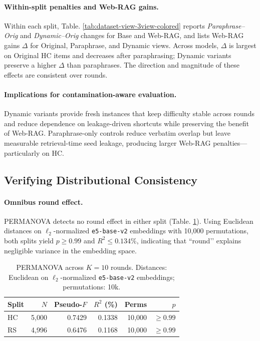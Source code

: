 \paragraph{Within-split penalties and Web-RAG gains.}
Within each split, Table. \ref{tab:dataset-view-3view-colored} reports \textit{Paraphrase–Orig} and \textit{Dynamic–Orig} changes for Base and Web-RAG, and lists Web-RAG gains $\Delta$ for Original, Paraphrase, and Dynamic views. Across models, $\Delta$ is largest on Original HC items and decreases after paraphrasing; Dynamic variants preserve a higher $\Delta$ than paraphrases. The direction and magnitude of these effects are consistent over rounds.

\paragraph{Implications for contamination-aware evaluation.}
Dynamic variants provide fresh instances that keep difficulty stable across rounds and reduce dependence on leakage-driven shortcuts while preserving the benefit of Web-RAG. Paraphrase-only controls reduce verbatim overlap but leave measurable retrieval-time seed leakage, producing larger Web-RAG penalties—particularly on HC. 


\subsection{Verifying Distributional Consistency}
\label{subsec:consistency-results}

\paragraph{Omnibus round effect.}
PERMANOVA detects no round effect in either split (Table. \ref{tab:omnibus}). Using Euclidean distances on $\ell_2$-normalized \texttt{e5-base-v2} embeddings with 10{,}000 permutations, both splits yield $p \geq 0.99$ and $R^2 \leq 0.134\%$, indicating that “round’’ explains negligible variance in the embedding space.

\begin{table}[t]
\centering
\setlength{\tabcolsep}{5pt}
\caption{PERMANOVA across $K{=}10$ rounds. Distances: Euclidean on $\ell_2$-normalized \texttt{e5-base-v2} embeddings; permutations: 10k.}
\label{tab:omnibus}
\begin{tabular}{lrrrrr}
\toprule
Split & $N$ & Pseudo-$F$ & $R^2$ (\%) & Perms & $p$ \\
\midrule
HC & 5{,}000 & 0.7429 & 0.1338 & 10{,}000 & $\geq 0.99$ \\
RS & 4{,}996 & 0.6476 & 0.1168 & 10{,}000 & $\geq 0.99$ \\
\bottomrule
\end{tabular}
\end{table}

